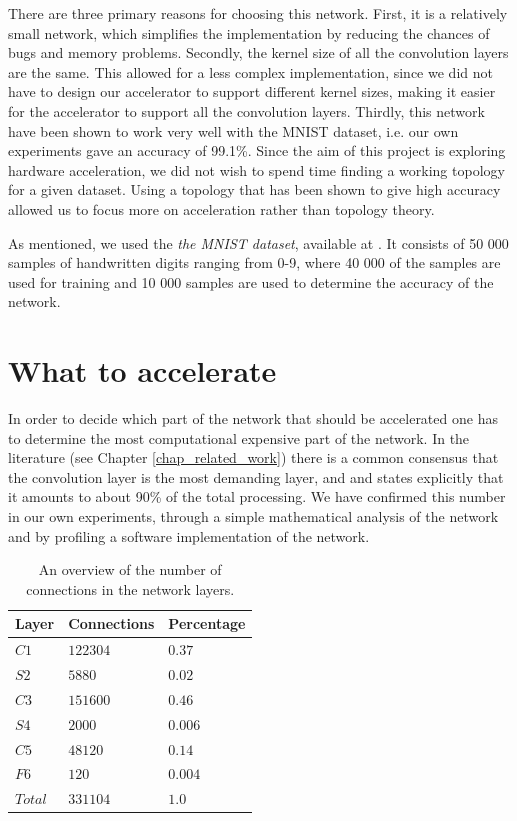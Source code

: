 There are three primary reasons for choosing this network. First, it is a relatively small network, which simplifies the implementation by reducing the chances of bugs and memory problems. Secondly, the kernel size of all the convolution layers are the same. This allowed for a less complex implementation, since we did not have to design our accelerator to support different kernel sizes, making it easier for the accelerator to support all the convolution layers. Thirdly, this network have been shown to work very well with the MNIST dataset, i.e. our own experiments gave an accuracy of 99.1\%. Since the aim of this project is exploring hardware acceleration, we did not wish to spend time finding a working topology for a given dataset. Using a topology that has been shown to give high accuracy allowed us to focus more on acceleration rather than topology theory.   

 As mentioned, we used the \textit{the MNIST dataset}, available at \cite{LeCun1998a}. It consists of 50 000 samples of handwritten digits ranging from 0-9, where 40 000 of the samples are used for
training and 10 000 samples are used to determine the accuracy of the network. 

\section{What to accelerate} \label{sec_what_to_accelerate}

In order to decide which part of the network that should be accelerated one has to determine the most computational expensive part of the network. In the literature (see Chapter \ref{chap_related_work}) there is a common consensus that the convolution layer is the most demanding layer, and \cite{Farabet2010} and \cite{Zhang2015} states explicitly that it amounts to about 90\% of the total processing. We have confirmed this number in our own experiments, through a simple mathematical analysis of the network and by profiling a software implementation of the network. 

\begin{table}
	\centering
    \begin{tabular}{| >{\centering\arraybackslash}m{0.8in} | >{\centering\arraybackslash}m{1.0in} | >{\centering\arraybackslash}m{1.0in} |}
    \hline
    Layer & Connections & Percentage  \\ \hline
    $ C1 $ & $ 122304 $ & $ 0.37 $ \\ \hline
    $ S2 $ & $ 5880  $ & $ 0.02 $ \\ \hline
    $ C3 $ & $ 151600 $ & $ 0.46 $  \\ \hline
    $ S4 $ & $ 2000 $ & $ 0.006 $ \\ \hline
    $ C5 $ & $ 48120 $ & $ 0.14 $  \\ \hline
    $ F6 $ & $ 120 $ & $ 0.004 $ \\ \hline
    $ Total $ & $ 331104 $ & $ 1.0 $  \\ \hline
        \end{tabular}
    \caption{An overview of the number of connections in the network layers.}
   	\label{tab_nofOps}
\end{table}

